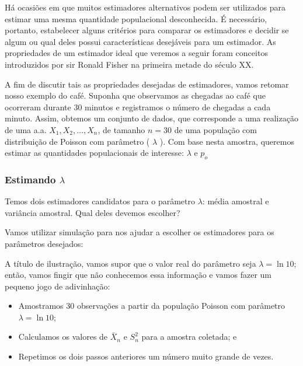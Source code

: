 \documentclass[
]{book}
\providecommand{\tightlist}{%
  \setlength{\itemsep}{0pt}\setlength{\parskip}{0pt}}
\theoremstyle{definition}
\theoremstyle{definition}
\theoremstyle{definition}
\theoremstyle{remark}
\begin{document}
Há ocasiões em que muitos estimadores alternativos podem ser utilizados para estimar uma mesma quantidade populacional desconhecida. É necessário, portanto, estabelecer alguns critérios para comparar os estimadores e decidir se algum ou qual deles possui características desejáveis para um estimador. As propriedades de um estimador ideal que veremos a seguir foram conceitos introduzidos por sir Ronald Fisher na primeira metade do século XX.

A fim de discutir tais as propriedades desejadas de estimadores, vamos retomar nosso exemplo do café. Suponha que observamos as chegadas ao café que ocorreram durante 30 minutos e registramos o número de chegadas a cada minuto. Assim, obtemos um conjunto de dados, que corresponde a uma realização de uma a.a. \(X_1, X_2, \ldots, X_n\), de tamanho \(n=30\) de uma população com distribuição de Poisson com parâmetro ( \(\lambda\) ). Com base nesta amostra, queremos estimar as quantidades populacionais de interesse: \(\lambda\) e \(p_o\)

\hypertarget{estimando-lambda-1}{%
\subsubsection*{\texorpdfstring{Estimando \(\lambda\)}{Estimando \textbackslash lambda}}\label{estimando-lambda-1}}

Temos dois estimadores candidatos para o parâmetro \(\lambda\): média amostral e variância amostral.
Qual deles devemos escolher?

Vamos utilizar simulação para nos ajudar a escolher os estimadores para os parâmetros desejados:

A título de ilustração, vamos supor que o valor real do parâmetro seja \(\lambda = \ln10\);
então, vamos fingir que não conhecemos essa informação e vamos fazer um pequeno jogo de adivinhação:

\begin{itemize}
\tightlist
\item
  Amostramos 30 observações a partir da população Poisson com parâmetro \(\lambda = \ln10\);\\
\item
  Calculamos os valores de \(\bar{X}_n\) e \(S_n^2\) para a amostra coletada; e\\
\item
  Repetimos os dois passos anteriores um número muito grande de vezes.
\end{itemize}
\end{document}
